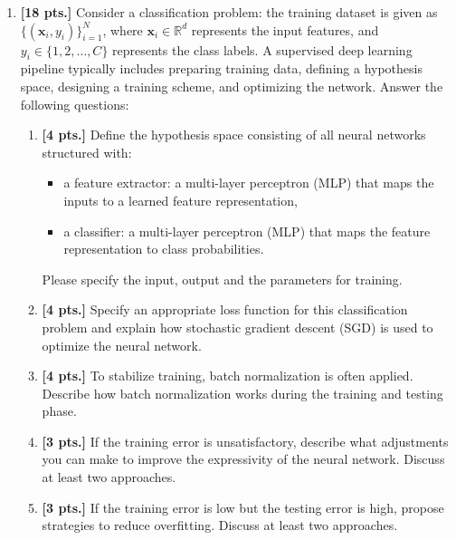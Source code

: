 \documentclass[11pt,a4paper]{article}
\begin{document}
\begin{enumerate}[label=\textbf{\arabic*.}]
    \item \textbf{[18 pts.]} Consider a classification problem: the training dataset is given as $\{(\mathbf{x}_i, y_i)\}_{i=1}^N$, where $\mathbf{x}_i \in \mathbb{R}^d$ represents the input features, and $y_i \in \{1, 2, \dots, C\}$ represents the class labels. A supervised deep learning pipeline typically includes preparing training data, defining a hypothesis space, designing a training scheme, and optimizing the network. Answer the following questions:
    \begin{enumerate}[label=(\a*)]
        \item \textbf{[4 pts.]} Define the hypothesis space consisting of all neural networks structured with:
        \begin{itemize}
            \item a feature extractor: a multi-layer perceptron (MLP) that maps the inputs to a learned feature representation,
            \item a classifier: a multi-layer perceptron (MLP) that maps the feature representation to class probabilities.
        \end{itemize}
        Please specify the input, output and the parameters for training.
        \item \textbf{[4 pts.]} Specify an appropriate loss function for this classification problem and explain how stochastic gradient descent (SGD) is used to optimize the neural network.
        \item \textbf{[4 pts.]} To stabilize training, batch normalization is often applied. Describe how batch normalization works during the training and testing phase.
        \item \textbf{[3 pts.]} If the training error is unsatisfactory, describe what adjustments you can make to improve the expressivity of the neural network. Discuss at least two approaches.
        \item \textbf{[3 pts.]} If the training error is low but the testing error is high, propose strategies to reduce overfitting. Discuss at least two approaches.
    \end{enumerate}


\end{enumerate}
\end{document}

